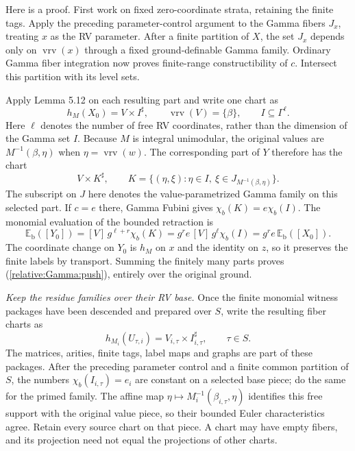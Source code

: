 \documentclass[12pt]{amsart}
\theoremstyle{remark}
\theoremstyle{definition}
\newcommand{\vrv}{\operatorname{vrv}}
\numberwithin{equation}{section}
\theoremstyle{plain}
\begin{document}
{Here is a proof. First work on fixed zero-coordinate
strata, retaining the finite tags.
Apply the preceding parameter-control argument to the
Gamma fibers $J_x$, treating $x$ as the RV parameter.
After a finite partition of $X$, the set $J_x$ depends only
on $\vrv(x)$ through a fixed ground-definable Gamma
family. Ordinary Gamma fiber integration now proves
finite-range constructibility of $c$.
Intersect this partition with its level sets.

Apply Lemma 5.12 on each resulting part and write one chart
as
\[
 h_M(X_0)=V\times I^\sharp,\qquad
 \vrv(V)=\{\beta\},\qquad I\subseteq\Gamma^\ell.
\]
Here $\ell$ denotes the number of free RV coordinates,
rather than the dimension of the Gamma set $I$.
Because $M$ is integral unimodular, the original values
are $M^{-1}(\beta,\eta)$ when $\eta=\vrv(w)$.
The corresponding part of $Y$ therefore has the chart
\[
 V\times K^\sharp,\qquad
 K=\{(\eta,\xi):\eta\in I,\
            \xi\in J_{M^{-1}(\beta,\eta)}\}.
\]
The subscript on $J$ here denotes the value-parametrized
Gamma family on this selected part.
If $c=e$ there, Gamma Fubini gives
$\chi_b(K)=e\chi_b(I)$.
The monomial evaluation of the bounded retraction is
\[
 \mathbb E_{\mathrm b}([Y_0])
      =[V]\,g^{\ell+r}\chi_b(K)
      =g^r e\,[V]\,g^\ell\chi_b(I)
      =g^r e\,\mathbb E_{\mathrm b}([X_0]).
\]
The coordinate change on $Y_0$ is $h_M$ on $x$ and the
identity on $z$, so it preserves the finite labels by
transport. Summing the finitely many parts proves
(\ref{relative:Gamma:push}), entirely over the original
ground.

\medskip
\noindent\emph{Keep the residue families over their RV base.}
Once the finite monomial witness packages have been
descended and prepared over $S$, write the resulting
fiber charts as
\[
 h_{M_i}(U_{\tau,i})
      =V_{i,\tau}\times I_{i,\tau}^{\sharp},
 \qquad \tau\in S.
\]
The matrices, arities, finite tags, label maps and graphs
are part of these packages.
After the preceding parameter control and a finite common
partition of $S$, the numbers
$\chi_b(I_{i,\tau})=e_i$ are constant on a selected base
piece; do the same for the primed family.
The affine map
$\eta\mapsto M_i^{-1}(\beta_{i,\tau},\eta)$ identifies
this free support with the original value piece, so their
bounded Euler characteristics agree.
Retain every source chart on that piece. A chart may have
empty fibers, and its projection need not equal the
projections of other charts.

}
\end{document}

